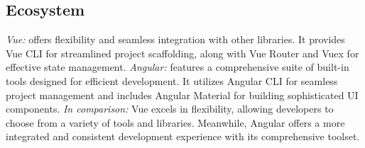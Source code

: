 \documentclass[conference]{IEEEtran}
\begin{document}
\subsection{Ecosystem}

\textit{Vue:} offers flexibility and seamless integration with other libraries. It provides Vue CLI for streamlined project scaffolding, along with Vue Router and Vuex for effective state management.
\newline\textit{Angular:} features a comprehensive suite of built-in tools designed for efficient development. It utilizes Angular CLI for seamless project management and includes Angular Material for building sophisticated UI components.
\newline\textit{In comparison:} Vue excels in flexibility, allowing developers to choose from a variety of tools and libraries. Meanwhile, Angular offers a more integrated and consistent development experience with its comprehensive toolset.





\end{document}

